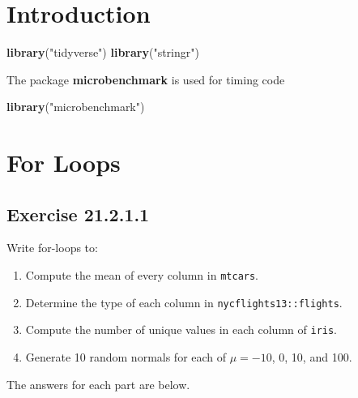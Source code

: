 \documentclass[]{book}
\newenvironment{Shaded}{\begin{snugshade}}{\end{snugshade}}
\newcommand{\KeywordTok}[1]{\textcolor[rgb]{0.13,0.29,0.53}{\textbf{#1}}}
\newcommand{\NormalTok}[1]{#1}
\newcommand{\StringTok}[1]{\textcolor[rgb]{0.31,0.60,0.02}{#1}}
\providecommand{\tightlist}{%
  \setlength{\itemsep}{0pt}\setlength{\parskip}{0pt}}
\theoremstyle{plain}
\theoremstyle{remark}
\begin{document}
\hypertarget{introduction-14}{%
\section{Introduction}\label{introduction-14}}

\begin{Shaded}
\begin{Highlighting}[]
\KeywordTok{library}\NormalTok{(}\StringTok{"tidyverse"}\NormalTok{)}
\KeywordTok{library}\NormalTok{(}\StringTok{"stringr"}\NormalTok{)}
\end{Highlighting}
\end{Shaded}

The package \textbf{microbenchmark} is used for timing code

\begin{Shaded}
\begin{Highlighting}[]
\KeywordTok{library}\NormalTok{(}\StringTok{"microbenchmark"}\NormalTok{)}
\end{Highlighting}
\end{Shaded}

\hypertarget{for-loops}{%
\section{For Loops}\label{for-loops}}

\hypertarget{exercise-21.2.1.1}{%
\subsection*{\texorpdfstring{Exercise
{21.2.1.1}}{Exercise 21.2.1.1}}\label{exercise-21.2.1.1}}

Write for-loops to:

\begin{enumerate}
\def\labelenumi{\arabic{enumi}.}
\tightlist
\item
  Compute the mean of every column in \texttt{mtcars}.
\item
  Determine the type of each column in \texttt{nycflights13::flights}.
\item
  Compute the number of unique values in each column of \texttt{iris}.
\item
  Generate 10 random normals for each of \(\mu = -10\), 0, 10, and 100.
\end{enumerate}

The answers for each part are below.
\end{document}

